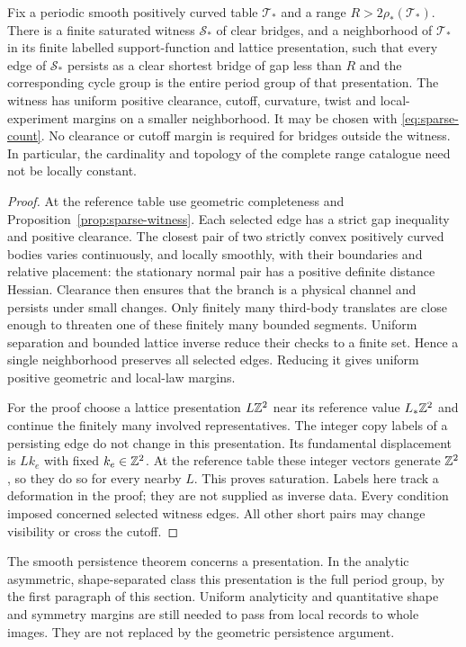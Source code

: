 \begin{theorem}
\label{thm:persistent-witness}
Fix a periodic smooth positively curved table $\mathcal T_*$ and a range
$R>2\rho_*(\mathcal T_*)$. There is a finite saturated witness
$\mathcal S_*$ of clear bridges, and a neighborhood of $\mathcal T_*$
in its finite labelled support-function and lattice presentation, such
that every edge of $\mathcal S_*$ persists as a clear shortest bridge
of gap less than $R$ and the corresponding cycle group is the entire
period group of that presentation. The witness has uniform positive
clearance, cutoff, curvature, twist and local-experiment margins on a
smaller neighborhood. It may be chosen with \eqref{eq:sparse-count}.
No clearance or cutoff margin is required for bridges outside the witness.
In particular, the cardinality and topology of the complete range
catalogue need not be locally constant.
\end{theorem}
\begin{proof}
At the reference table use geometric completeness and
Proposition~\ref{prop:sparse-witness}. Each selected edge has a strict
gap inequality and positive clearance. The closest pair of two strictly
convex positively curved bodies varies continuously, and locally smoothly,
with their boundaries and relative placement: the stationary normal
pair has a positive definite distance Hessian. Clearance then ensures
that the branch is a physical channel and persists under small changes.
Only finitely many third-body translates are close enough to threaten
one of these finitely many bounded segments. Uniform separation and
bounded lattice inverse reduce their checks to a finite set. Hence a
single neighborhood preserves all selected edges. Reducing it gives
uniform positive geometric and local-law margins.

For the proof choose a lattice presentation $L\mathbb Z^2$ near its reference
value $L_*\mathbb Z^2$ and continue the finitely many involved representatives.
The integer copy labels of a persisting edge do not change in this
presentation. Its fundamental displacement is $Lk_e$ with fixed
$k_e\in\mathbb Z^2$. At the reference table these integer vectors generate
$\mathbb Z^2$, so they do so for every nearby $L$. This proves saturation.
Labels here track a deformation in the proof; they are not supplied
as inverse data. Every condition imposed concerned selected witness
edges. All other short pairs may change visibility or cross the cutoff.
\end{proof}

The smooth persistence theorem concerns a presentation. In the analytic
asymmetric, shape-separated class this presentation is the full period
group, by the first paragraph of this section. Uniform analyticity and
quantitative shape and symmetry margins are still needed to pass from
local records to whole images. They are not replaced by the geometric
persistence argument.

